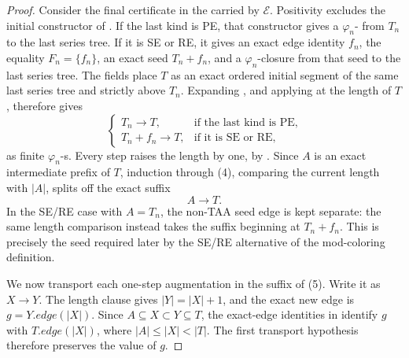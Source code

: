 \begin{proof}
Consider the final certificate in the
 carried by \(\mathcal E\).  Positivity excludes
the initial constructor of .  If the last
kind is PE, that constructor gives a
\(\varphi_n\)- from \(T_n\) to the last series
tree.  If it is SE or RE, it gives an exact edge identity \(f_n\), the
equality \(F_n=\{f_n\}\), an exact
 seed \(T_n+f_n\), and a
\(\varphi_n\)-closure from that seed to the last series tree.  The
 fields place \(T\) as an exact ordered
initial segment of the same last series tree and strictly above \(T_n\).
Expanding , and applying
 at the length of \(T\),
therefore gives
\[
\begin{cases}
T_n\longrightarrow T,&\text{if the last kind is PE},\\
T_n+f_n\longrightarrow T,&\text{if it is SE or RE},
\end{cases}                                                     \tag{4}
\]
as finite \(\varphi_n\)-s.
Every step raises the length by one, by
.  Since \(A\) is an exact intermediate
prefix of \(T\), induction through (4), comparing the current length with
\(|A|\), splits off the exact suffix
\[
                       A\longrightarrow T.                    \tag{5}
\]
In the SE/RE case with \(A=T_n\), the non-TAA seed edge is kept separate:
the same length comparison instead takes the suffix beginning at
\(T_n+f_n\).  This is precisely the seed required later by the SE/RE
alternative of the mod-coloring definition.

We now transport each one-step augmentation in the suffix of (5).
Write it as \(X\to Y\).  The length clause gives
\(|Y|=|X|+1\), and the exact new edge is
\(g=Y.\mathit{edge}(|X|)\).  Since \(A\subseteq X\subset Y\subseteq T\),
the exact-edge identities in
 identify \(g\) with
\(T.\mathit{edge}(|X|)\), where \(|A|\leq |X|<|T|\).  The first transport
hypothesis therefore preserves the value of \(g\).


\end{proof}
